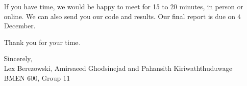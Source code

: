 If you have time, we would be happy to meet for 15 to 20 minutes, in person or online. We can also send you our code
and results. Our final report is due on 4 December.

Thank you for your time.

Sincerely,\\[4pt]
Lex Berezowski, Amirsaeed Ghodsinejad and Pahansith Kiriwaththuduwage\\
BMEN 600, Group 11
